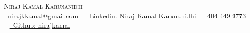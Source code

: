 \documentclass[letterpaper,11pt]{article}
\begin{document}

\begin{center}
    {\huge \scshape Niraj Kamal Karunanidhi} \\ \vspace{1pt}
    \href{mailto:nirajkkamal@gmail.com}{\raisebox{-0.1\height}\faEnvelope\  \underline{nirajkkamal@gmail.com}} ~ \href{https://linkedin.com/in/niraj-kamal-k-31687212a/}{\raisebox{-0.1\height}\faLinkedin\ \underline{Linkedin: Niraj Kamal Karunanidhi}} ~ \href{Tel: 404-449-9773}{\raisebox{-0.1\height}\faPhone\ \underline{404 449 9773}} ~ \href{https://github.com/nirajkamal}{\raisebox{-0.1\height}\faGithub\ \underline{Github: nirajkamal}}
    \vspace{-4pt}

    
\end{center}

\end{document}
